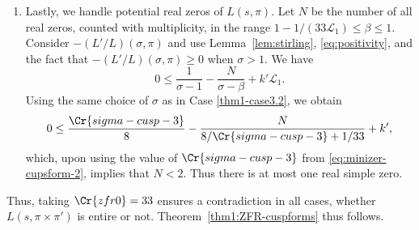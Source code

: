 \documentclass[12pt,reqno]{amsart}
\theoremstyle{remark}
\numberwithin{equation}{section}
\begin{document}
\begin{enumerate}[ leftmargin=1cm]
        \item 
        
        Lastly, we handle potential real zeros of $L(s, \pi)$.
        Let $N$ be the number of all real zeros, counted with multiplicity, in the range $1- 1/(33\mathcal{L}_1) \le \beta \le 1$. Consider $-(L'/L)(\sigma,\pi)$ and use Lemma~\ref{lem:stirling}, \eqref{eq:positivity}, and the fact that $-(L'/L)(\sigma,\pi) \ge 0$ when $\sigma >1$. We have
        \[
        0 \le \frac{1}{\sigma-1}-\frac{N}{\sigma-\beta}+k'\mathcal{L}_1.
        \]
        Using the same choice of $\sigma$ as in Case \eqref{thm1-case3.2}, we obtain
        \[
        0 \le \frac{\Cr{sigma-cusp-3}}{8}-\frac{N}{8/\Cr{sigma-cusp-3}+1/33}+k',
        \]
        which, upon using the value of $\Cr{sigma-cusp-3}$ from \eqref{eq:minizer-cupsform-2}, implies that $N < 2$. Thus there is at most one real simple zero.
    \end{enumerate}
   
   Thus, taking $\Cr{zfr0} = 33$ ensures a contradiction in all cases, whether $L(s, \pi \times \pi')$ is entire or not.  Theorem~\ref{thm1:ZFR-cuspforms} thus follows.
\end{document}
